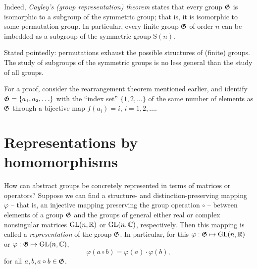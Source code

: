 Indeed,  {\em Cayley's (group representation) theorem}
states that every group ${\frak G}$ is isomorphic to a subgroup
of the symmetric group; that is, it is isomorphic to some permutation group.
In particular, every finite group ${\frak G}$ of order $n$  can be imbedded as
a subgroup
of the symmetric group $\textrm{S}(n)$.

Stated pointedly: permutations exhaust the possible structures of (finite) groups.
The study of subgroups of the symmetric groups is no less general than the study of all groups.

{\color{OliveGreen}
\bproof
For a proof, consider the rearrangement theorem mentioned earlier, and identify ${\frak G}=\{a_1,a_2,\ldots\}$
with the ``index set'' $\{1,2,\ldots\}$ of the same number of elements as ${\frak G}$ through a bijective map $f(a_i)=i$,
$i= 1,2, \ldots$.
\eproof
}





\section{Representations by homomorphisms}

How can abstract groups be concretely represented in terms of matrices or operators?
Suppose we can find a structure- and distinction-preserving mapping $\varphi$ -- that is, an injective mapping preserving the group operation $\circ$  --
between elements of a group ${\frak G}$
and the groups of general either real or complex nonsingular  matrices $\textrm{GL}(n,{\Bbb R})$ or $\textrm{GL}(n,{\Bbb C})$, respectively.
Then this mapping is called
a {\em representation}
 of the group ${\frak G}$.
In particular,
for this $\varphi  : {\frak G} \mapsto  \textrm{GL}(n,{\Bbb R})$ or $\varphi : {\frak G} \mapsto \textrm{GL}(n,{\Bbb C})$,
\begin{equation}
\varphi (a\circ b)   = \varphi (a)\cdot \varphi (b),
\end{equation}
for all
$a,b, a\circ b \in {\frak G}$.


